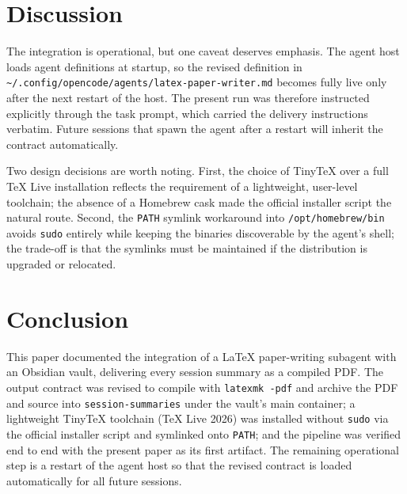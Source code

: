 \documentclass[11pt]{article}
\begin{document}
\section{Discussion}
\label{sec:discussion}

The integration is operational, but one caveat deserves emphasis. The agent host loads agent definitions at startup, so the revised definition in \texttt{\textasciitilde/.config/opencode/agents/latex-paper-writer.md} becomes fully live only after the next restart of the host. The present run was therefore instructed explicitly through the task prompt, which carried the delivery instructions verbatim. Future sessions that spawn the agent after a restart will inherit the contract automatically.

Two design decisions are worth noting. First, the choice of TinyTeX over a full TeX Live installation reflects the requirement of a lightweight, user-level toolchain; the absence of a Homebrew cask made the official installer script the natural route. Second, the \texttt{PATH} symlink workaround into \texttt{/opt/homebrew/bin} avoids \texttt{sudo} entirely while keeping the binaries discoverable by the agent's shell; the trade-off is that the symlinks must be maintained if the distribution is upgraded or relocated. %

\section{Conclusion}
\label{sec:conclusion}

This paper documented the integration of a LaTeX paper-writing subagent with an Obsidian vault, delivering every session summary as a compiled PDF. The output contract was revised to compile with \texttt{latexmk -pdf} and archive the PDF and source into \texttt{session-summaries} under the vault's main container; a lightweight TinyTeX toolchain (TeX Live 2026) was installed without \texttt{sudo} via the official installer script and symlinked onto \texttt{PATH}; and the pipeline was verified end to end with the present paper as its first artifact. The remaining operational step is a restart of the agent host so that the revised contract is loaded automatically for all future sessions.
\end{document}
